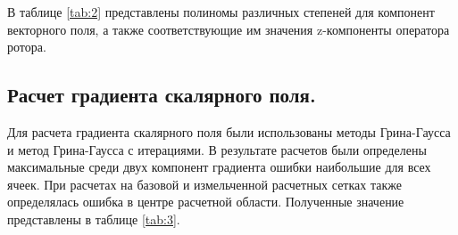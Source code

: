 В таблице \ref{tab:2} представлены полиномы различных степеней для компонент векторного поля, а также соответствующие им значения z-компоненты оператора ротора.

\begin{table}[H]
    \centering
    \caption{Виды полиномов используемых в дальнеших расчетах с точным ротором векторного поля}

    \label{tab:2}
\end{table}

\subsection{Расчет градиента скалярного поля.}
Для расчета градиента скалярного поля были использованы методы Грина-Гаусса и метод Грина-Гаусса с итерациями. В результате расчетов были определены максимальные среди двух компонент градиента ошибки наибольшие для всех ячеек. При расчетах на базовой и измельченной расчетных сетках также определялась ошибка в центре расчетной области. Полученные значение представлены в таблице \ref{tab:3}.


